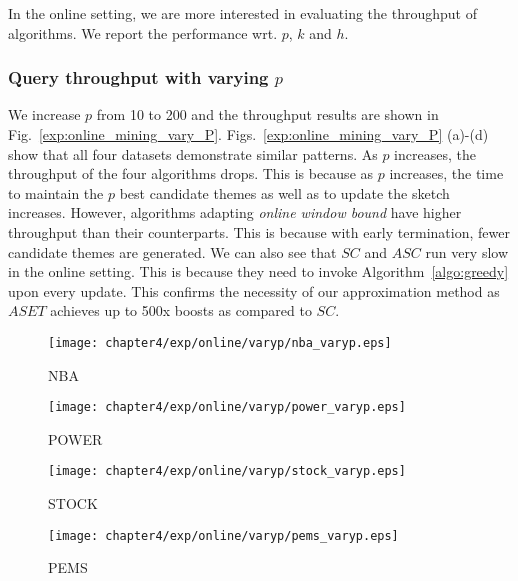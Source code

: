 In the online setting, we are more interested in evaluating the throughput of algorithms. We report the performance wrt. $p$, $k$ and $h$.


\subsubsection{Query throughput with varying $p$}
We increase $p$ from 10 to 200 and the throughput results are 
shown in Fig.~\ref{exp:online_mining_vary_P}.
Figs.~\ref{exp:online_mining_vary_P} (a)-(d) show that all four datasets
demonstrate similar patterns. As $p$ increases, 
the throughput of the four algorithms drops.
This is because as $p$ increases, the time to maintain the $p$ best candidate themes
as well as to update the sketch increases. However, algorithms adapting 
\emph{online window bound} have higher throughput than their counterparts. 
This is because with early termination, fewer candidate themes are generated. 
We can also see that $SC$ and $ASC$ run very slow in the online setting. 
This is because they need to invoke Algorithm~\ref{algo:greedy} upon every update.
This confirms the necessity of our approximation method as $ASET$ achieves up to 500x boosts as compared to $SC$.

\begin{figure*}[t]
\centering
    \begin{subfigure}[b]{0.45\textwidth}
        \texttt{[image: chapter4/exp/online/varyp/nba\_varyp.eps]}
        \caption{NBA}
    \end{subfigure}
    \begin{subfigure}[b]{0.45\textwidth}
        \texttt{[image: chapter4/exp/online/varyp/power\_varyp.eps]}
        \caption{POWER}
    \end{subfigure}
    \begin{subfigure}[b]{0.45\textwidth}
        \texttt{[image: chapter4/exp/online/varyp/stock\_varyp.eps]}
        \caption{STOCK}
    \end{subfigure}
    \begin{subfigure}[b]{0.45\textwidth}
        \texttt{[image: chapter4/exp/online/varyp/pems\_varyp.eps]}
        \caption{PEMS}
    \end{subfigure}
\caption{Throughput in online scenario with varying $p$.}
\label{exp:online_mining_vary_P}
\end{figure*}

